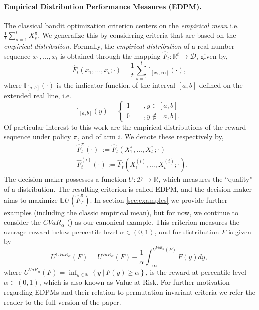 \documentclass[final,12pt]{colt2018}
\newcommand{\prn}[1]{\left( #1 \right)}
\newcommand{\brc}[1]{\left\lbrace #1 \right\rbrace}
\newcommand{\brk}[1]{\left\lbrack #1 \right\rbrack}
\newcommand{\indFunc}[2][\infty]{\mathds{I}_{\brk{#2,#1}}}
\newcommand{\indFuncAt}[3][\infty]{\indFunc[#1]{#2}\prn{#3}}
\newcommand{\EE}[2][]{\mathbb{E}_{#1}{#2}}
\newcommand{\RR}[1][]{\mathds{R}^{#1}}
\newcommand{\CVAR}[1][\alpha]{CVaR_{#1}}
\newcommand{\VAR}[1][\alpha]{VaR_{#1}}
\newcommand{\EDRMabbrv}{EDPM}
\newcommand{\XtPi}[1][t]{X_{#1}^{\policy}}
\newcommand{\Xti}[2][i]{X_{#2}^{(#1)}}
\newcommand{\policy}[1][]{\pi^{#1}}
\newcommand{\RHat}[1][]{{U}^{#1}}
\newcommand{\RHatFunc}[2][]{\RHat[{#1}] \prn{#2}}
\newcommand{\FHatt}[1][t]{\hat{F}_{#1}}
\newcommand{\FHattFunc}[2][t]{\hat{F}_{#1} \prn{#2}}
\newcommand{\FHatPi}[2][\policy]{\hat{F}_{#2}^{#1}}
\newcommand{\DistSet}{\mathcal{D}}
\begin{document}
	\paragraph{Empirical Distribution Performance Measures (\EDRMabbrv).} The classical bandit optimization criterion centers on the \textit{empirical mean} i.e. $\frac{1}{t}\sum_{s=1}^{t}\XtPi[s]$. We generalize this by considering criteria that are based on the \textit{empirical distribution}. Formally, the \textit{empirical distribution} of a real number sequence $x_1, \ldots, x_t$ is obtained through the mapping ${\FHatt : \RR[t] \rightarrow \DistSet}$, given by,
	\begin{equation} \label{eq:empDistMap}
	\FHattFunc{x_1,\ldots,x_t ; \cdot} = \frac{1}{t}\sum_{s=1}^{t}\indFunc{x_s} (\cdot),
	\end{equation}
	where $\indFunc[b]{a}(\cdot)$ is the indicator function of the interval $\brk{a,b}$ defined on the extended real line, i.e.
	\begin{equation*}
	\indFuncAt[b]{a}{y} = \begin{cases}
	1 \qquad, y \in [a,b] \\
	0 \qquad, y \notin [a,b].
	\end{cases}
	\end{equation*}
	Of particular interest to this work are the empirical distributions of the reward sequence under policy $\policy$, and of arm $i$. We denote these respectively by,
	\begin{align}
	&\FHatPi{t}(\cdot) ~:= \FHattFunc{\XtPi[1], \ldots, \XtPi[t]; \cdot}  \label{eq:FhatPiAbbrv}\\
	&\FHatPi[(i)]{t}(\cdot) := \FHattFunc{\Xti{1}, \ldots, \Xti{t}; \cdot}.  \label{eq:FhatiAbbrv}
	\end{align}
	The decision maker possesses a function $\RHat : \DistSet \to \RR$, which measures the ``quality'' of a distribution. The resulting criterion is called \EDRMabbrv, and the decision maker aims to maximize $\EE{\RHatFunc{\FHatPi{T}}}$. In section \ref{sec:examples} we provide further examples (including the classic empirical mean), but for now, we continue to consider the $\CVAR$ (\cite{rockafellar2000optimization}) as our canonical example. This criterion measures the average reward below percentile level $\alpha \in \prn{0,1}$, and for distribution $F$ is given by
	\begin{equation} \label{eq:cvarDef}
	\RHatFunc[\CVAR]{F} = \RHatFunc[\VAR]{F} - \frac{1}{\alpha} \int_{-\infty}^{\RHatFunc[\VAR]{F}} F(y) dy,
	\end{equation}
	where $\RHatFunc[\VAR]{F} = \inf_{y \in \RR}\brc{y ~\big|~ F(y) \ge \alpha}$, is the reward at percentile level $\alpha \in \prn{0,1}$, which is also known as Value at Risk.
	For further motivation regarding \EDRMabbrv s and their relation to permutation invariant criteria we refer the reader to the full version of the paper.
	
\end{document}
